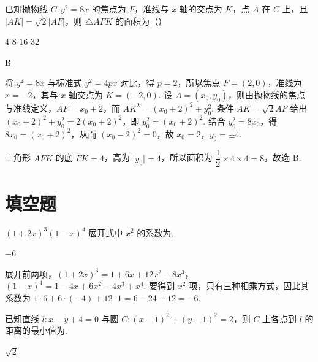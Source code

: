 \begin{problem}
已知抛物线 \(C:y^2=8x\) 的焦点为 \(F\)，准线与 \(x\) 轴的交点为 \(K\)，点 \(A\) 在 \(C\) 上，且 \(\lvert AK\rvert=\sqrt2\lvert AF\rvert\)，则 \(\triangle AFK\) 的面积为（\quad）

\choices
    {\(4\)}
    {\(8\)}
    {\(16\)}
    {\(32\)}
\end{problem}

\begin{answer}
B
\end{answer}

\begin{solution}
将 \(y^2=8x\) 与标准式 \(y^2=4px\) 对比，得 \(p=2\)，所以焦点 \(F=(2,0)\)，准线为 \(x=-2\)，其与 \(x\) 轴交点为 \(K=(-2,0)\). 设 \(A=(x_0,y_0)\)，则由抛物线的焦点与准线定义，\(AF=x_0+2\)，而 \(AK^2=(x_0+2)^2+y_0^2\). 条件 \(AK=\sqrt2AF\) 给出 \((x_0+2)^2+y_0^2=2(x_0+2)^2\)，即 \(y_0^2=(x_0+2)^2\). 结合 \(y_0^2=8x_0\)，得 \(8x_0=(x_0+2)^2\)，从而 \((x_0-2)^2=0\)，故 \(x_0=2\)，\(y_0=\pm4\).

三角形 \(AFK\) 的底 \(FK=4\)，高为 \(\lvert y_0\rvert=4\)，所以面积为 \(\dfrac12\times4\times4=8\)，故选 B.
\end{solution}

\section{填空题}

\begin{problem}
\((1+2x)^3(1-x)^4\) 展开式中 \(x^2\) 的系数为\fillinblank{}.
\end{problem}

\begin{answer}
\(-6\)
\end{answer}

\begin{solution}
展开前两项，\((1+2x)^3=1+6x+12x^2+8x^3\)，\((1-x)^4=1-4x+6x^2-4x^3+x^4\). 要得到 \(x^2\) 项，只有三种相乘方式，因此其系数为 \(1\cdot6+6\cdot(-4)+12\cdot1=6-24+12=-6\).
\end{solution}

\begin{problem}
已知直线 \(l:x-y+4=0\) 与圆 \(C:(x-1)^2+(y-1)^2=2\)，则 \(C\) 上各点到 \(l\) 的距离的最小值为\fillinblank{}.
\end{problem}

\begin{answer}
\(\sqrt{2}\)
\end{answer}

